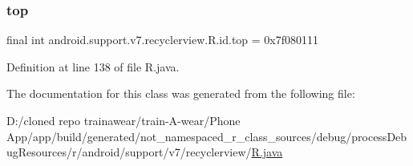\subsubsection{\texorpdfstring{top}{top}}
{\footnotesize\ttfamily final int android.\+support.\+v7.\+recyclerview.\+R.\+id.\+top = 0x7f080111\hspace{0.3cm}{\ttfamily [static]}}



Definition at line 138 of file R.\+java.



The documentation for this class was generated from the following file\+:\begin{DoxyCompactItemize}
\item 
D\+:/cloned repo trainawear/train-\/\+A-\/wear/\+Phone App/app/build/generated/not\+\_\+namespaced\+\_\+r\+\_\+class\+\_\+sources/debug/process\+Debug\+Resources/r/android/support/v7/recyclerview/\mbox{\hyperlink{process_debug_resources_2r_2android_2support_2v7_2recyclerview_2_r_8java}{R.\+java}}\end{DoxyCompactItemize}
